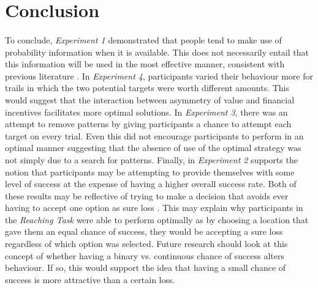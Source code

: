 \documentclass[12pt]{article}
\begin{document}
\section*{Conclusion}
\paragraph{} To conclude, \textit{Experiment 1} demonstrated that people tend to make use of probability information when it is available. This does not necessarily entail that this information will be used in the most effective manner, consistent with previous literature \citep{koehler2014probability}. In \textit{Experiment 4}, participants varied their behaviour more for trails in which the two potential targets were worth different amounts. This would suggest that the interaction between asymmetry of value and financial incentives facilitates more optimal solutions. In \textit{Experiment 3}, there was an attempt to remove patterns by giving participants a chance to attempt each target on every trial. Even this did not encourage participants to perform in an optimal manner suggesting that the absence of use of the optimal strategy was not simply due to a search for patterns. Finally, in \textit{Experiment 2} supports the notion that participants may be attempting to provide themselves with some level of success at the expense of having a higher overall success rate. Both of these results may be reflective of trying to make a decision that avoids ever having to accept one option as sure loss \cite{CHAPMAN2010168,KahnemanProspect,Hudson2007probmove}. This may explain why participants in the \textit{Reaching Task} \citep{clarke2015failure} were able to perform optimally as by choosing a location that gave them an equal chance of success, they would be accepting a sure loss regardless of which option was selected. Future research should look at this concept of whether having a binary vs. continuous chance of success alters behaviour. If so, this would support the idea that having a small chance of success is more attractive than a certain loss.

\clearpage
\begingroup\onehalfspacing
\newpage
{}


\endgroup
\end{document}
